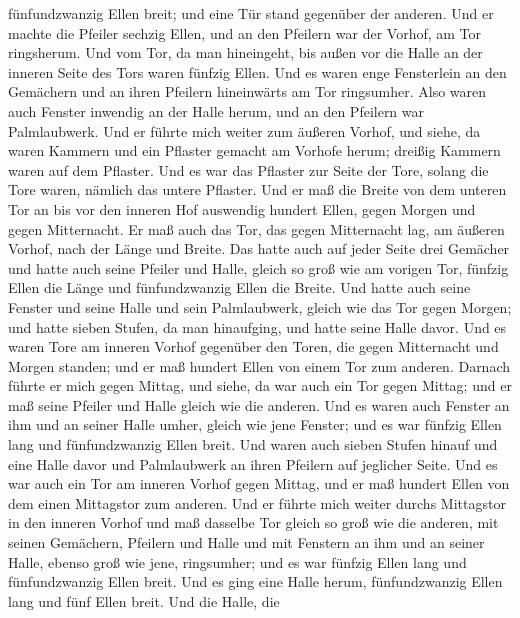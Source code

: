 fünfundzwanzig Ellen breit; und eine Tür stand gegenüber der anderen.
 Und er machte die Pfeiler sechzig Ellen, und an den
Pfeilern war der Vorhof, am Tor ringsherum.  Und vom Tor,
da man hineingeht, bis außen vor die Halle an der inneren Seite des Tors
waren fünfzig Ellen.  Und es waren enge Fensterlein an
den Gemächern und an ihren Pfeilern hineinwärts am Tor ringsumher. Also
waren auch Fenster inwendig an der Halle herum, und an den Pfeilern war
Palmlaubwerk.  Und er führte mich weiter zum äußeren
Vorhof, und siehe, da waren Kammern und ein Pflaster gemacht am Vorhofe
herum; dreißig Kammern waren auf dem Pflaster.  Und es
war das Pflaster zur Seite der Tore, solang die Tore waren, nämlich das
untere Pflaster.  Und er maß die Breite von dem unteren
Tor an bis vor den inneren Hof auswendig hundert Ellen, gegen Morgen und
gegen Mitternacht.  Er maß auch das Tor, das gegen
Mitternacht lag, am äußeren Vorhof, nach der Länge und Breite.
 Das hatte auch auf jeder Seite drei Gemächer und hatte
auch seine Pfeiler und Halle, gleich so groß wie am vorigen Tor, fünfzig
Ellen die Länge und fünfundzwanzig Ellen die Breite.  Und
hatte auch seine Fenster und seine Halle und sein Palmlaubwerk, gleich
wie das Tor gegen Morgen; und hatte sieben Stufen, da man hinaufging,
und hatte seine Halle davor.  Und es waren Tore am
inneren Vorhof gegenüber den Toren, die gegen Mitternacht und Morgen
standen; und er maß hundert Ellen von einem Tor zum anderen.
 Darnach führte er mich gegen Mittag, und siehe, da war
auch ein Tor gegen Mittag; und er maß seine Pfeiler und Halle gleich wie
die anderen.  Und es waren auch Fenster an ihm und an
seiner Halle umher, gleich wie jene Fenster; und es war fünfzig Ellen
lang und fünfundzwanzig Ellen breit.  Und waren auch
sieben Stufen hinauf und eine Halle davor und Palmlaubwerk an ihren
Pfeilern auf jeglicher Seite.  Und es war auch ein Tor am
inneren Vorhof gegen Mittag, und er maß hundert Ellen von dem einen
Mittagstor zum anderen.  Und er führte mich weiter durchs
Mittagstor in den inneren Vorhof und maß dasselbe Tor gleich so groß wie
die anderen,  mit seinen Gemächern, Pfeilern und Halle
und mit Fenstern an ihm und an seiner Halle, ebenso groß wie jene,
ringsumher; und es war fünfzig Ellen lang und fünfundzwanzig Ellen
breit.  Und es ging eine Halle herum, fünfundzwanzig
Ellen lang und fünf Ellen breit.  Und die Halle, die
